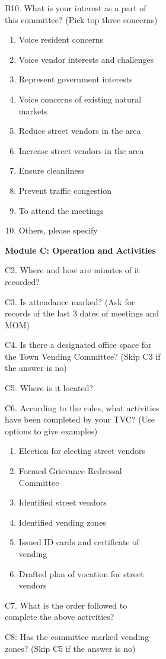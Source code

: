 \documentclass[a4paper, 12pt, twoside]{article}
\begin{document}
\begin{figure}
{\begin{figure}
\begin{figure}
\begin{mdframed}[backgroundcolor=gray!20]
\begin{enumerate}[nosep]
B10. What is your interest as a part of this committee? (Pick top three concerns)
\begin{enumerate}[nosep]
\item Voice resident concerns
\item Voice vendor interests and challenges
\item Represent government interests
\item Voice concerns of existing natural markets
\item Reduce street vendors in the area
\item Increase street vendors in the area
\item Ensure cleanliness
\item Prevent traffic congestion
\item To attend the meetings
\item Others, please specify
\end{enumerate}

\textbf{Module C: Operation and Activities}


C2. Where and how are minutes of it recorded?

C3. Is attendance marked? (Ask for records of the last 3 dates of meetings and MOM)

C4. Is there a designated office space for the Town Vending Committee? (Skip C3 if the answer is no)

C5. Where is it located?

C6. According to the rules, what activities have been completed by your TVC? (Use options to give examples)
\begin{enumerate}[nosep]
\item Election for electing street vendors
\item Formed Grievance Redressal Committee
\item Identified street vendors
\item Identified vending zones
\item Issued ID cards and certificate of vending
\item Drafted plan of vocation for street vendors
\end{enumerate}

C7. What is the order followed to complete the above activities?

C8: Has the committee marked vending zones? (Skip C5 if the answer is no)


\end{enumerate}
\end{mdframed}
\end{figure}
\end{figure}}
\end{figure}
\end{document}
